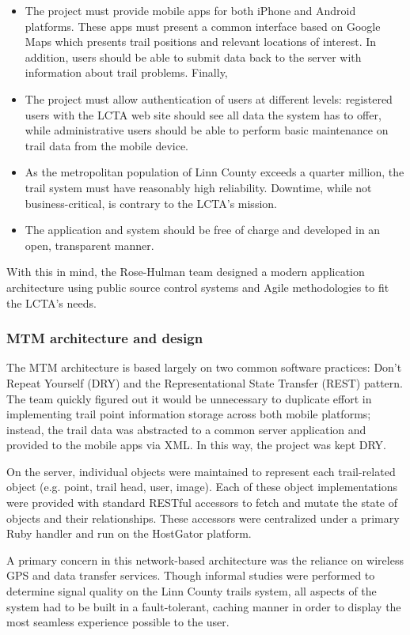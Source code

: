 \documentclass{article}
\begin{document}
\begin{itemize}
\item The project must provide mobile apps for both iPhone and Android platforms. These apps must present a common interface based on Google Maps which presents trail positions and relevant locations of interest. In addition, users should be able to submit data back to the server with information about trail problems. Finally, 
\item The project must allow authentication of users at different levels: registered users with the LCTA web site should see all data the system has to offer, while administrative users should be able to perform basic maintenance on trail data from the mobile device.
\item As the metropolitan population of Linn County exceeds a quarter million, the trail system must have reasonably high reliability. Downtime, while not business-critical, is contrary to the LCTA's mission.
\item The application and system should be free of charge and developed in an open, transparent manner.
\end{itemize}

With this in mind, the Rose-Hulman team designed a modern application architecture using public source control systems and Agile methodologies to fit the LCTA's needs.

\subsubsection*{MTM architecture and design}
The MTM architecture is based largely on two common software practices: Don't Repeat Yourself (DRY) and the Representational State Transfer (REST) pattern. The team quickly figured out it would be unnecessary to duplicate effort in implementing trail point information storage across both mobile platforms; instead, the trail data was abstracted to a common server application and provided to the mobile apps via XML. In this way, the project was kept DRY.

On the server, individual objects were maintained to represent each trail-related object (e.g. point, trail head, user, image). Each of these object implementations were provided with standard RESTful accessors to fetch and mutate the state of objects and their relationships. These accessors were centralized under a primary Ruby handler and run on the HostGator platform.

A primary concern in this network-based architecture was the reliance on wireless GPS and data transfer services. Though informal studies were performed to determine signal quality on the Linn County trails system, all aspects of the system had to be built in a fault-tolerant, caching manner in order to display the most seamless experience possible to the user.
\end{document}
